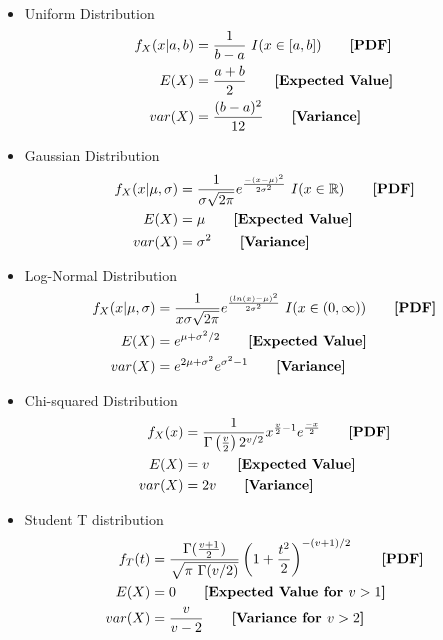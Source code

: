 \documentclass{article}
\begin{document}
\begin{multicols}{2}
\begin{itemize}
\begin{align*}
  \end{align*}
  \item Uniform Distribution
  \begin{align*}
    f_X(x|a,b) &= \frac{1}{b-a}~ I(x \in [a,b]) \tag*{\textbf{[PDF]}}\\
    E(X) &= \frac{a+b}{2} \tag*{\textbf{[Expected Value]}}\\
    var(X) &= \frac{(b-a)^2}{12} \tag*{\textbf{[Variance]}}
  \end{align*}
  \item Gaussian Distribution
  \begin{align*}
    f_X(x|\mu,\sigma) &= \frac{1}{\sigma\sqrt{2\pi}} e^{\frac{-(x-\mu)^2}{2\sigma^2}}~ I(x \in \mathbb{R}) \tag*{\textbf{[PDF]}}\\
    E(X) &= \mu\tag*{\textbf{[Expected Value]}}\\ 
    var(X) &= \sigma^2\tag*{\textbf{[Variance]}}\\ 
  \end{align*}
  \item Log-Normal Distribution
  \begin{align*}
    f_X(x|\mu, \sigma) &= \frac{1}{x \sigma \sqrt{2 \pi}} e^{\frac{(ln(x)-\mu)^2}{2 \sigma^2}}~ I(x \in (0,\infty)) \tag*{\textbf{[PDF]}}\\
	  E(X) &= e^{\mu + \sigma^2/2} \tag*{\textbf{[Expected Value]}}\\
  	var(X) &= e^{2\mu + \sigma^2}e^{\sigma^2-1} \tag*{\textbf{[Variance]}}\\
  \end{align*}
  \item Chi-squared Distribution
  \begin{align*}
    f_X(x) &= \frac{1}{\Gamma\left(\frac{v}{2}\right)2^{v/2}} x^{\frac{v}{2}-1} e^{\frac{-x}{2}} \tag*{\textbf{[PDF]}}\\
    E(X) &= v \tag*{\textbf{[Expected Value]}}\\
    var(X) &= 2v \tag*{\textbf{[Variance]}}\\
  \end{align*}
  \item Student T distribution
  \begin{align*}
      f_T(t) &= \frac{\Gamma(\frac{v+1}{2})}{\sqrt{\pi~\Gamma(v/2)}} \left(1+\frac{t^2}{2}\right)^{-(v+1)/2}\tag*{\textbf{[PDF]}}\\
      E(X) &= 0 \tag*{\textbf{[Expected Value for $v>1$]}}\\
      var(X) &= \frac{v}{v-2} \tag*{\textbf{[Variance for $v>2$]}}\\

\end{align*}
\end{itemize}
\end{multicols}
\end{document}
